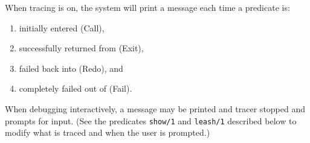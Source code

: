 \begin{description}

When tracing is on, the system will print a message each time a
predicate is:
\begin{enumerate} 
\item initially entered (Call), 
\item successfully returned from (Exit), 
\item failed back into (Redo), and
\item completely failed out of (Fail).  
\end{enumerate}
When debugging interactively, a message may be printed and tracer
stopped and prompts for input.  (See the predicates {\tt show/1} and
{\tt leash/1} described below to modify what is traced and when the
user is prompted.)


\end{description}
